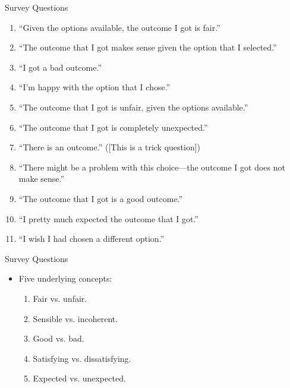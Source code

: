 \documentclass[xcolor=x11names]{beamer}
\begin{document}
\begin{frame}{Survey Questions}
  \footnotesize
  \itshape
  \begin{enumerate}\addtolength{\itemsep}{0.5\baselineskip}
    \item ``Given the options available, the outcome I got is fair.''
    \item ``The outcome that I got makes sense given the option that I selected.''
    \item ``I got a bad outcome.''
    \item ``I'm happy with the option that I chose.''
    \item ``The outcome that I got is unfair, given the options available.''
    \item ``The outcome that I got is completely unexpected.''
    \item ``There is an outcome.'' ([This is a trick question])
    \item ``There might be a problem with this choice---the outcome I got does not make sense.''
    \item ``The outcome that I got is a good outcome.''
    \item ``I pretty much expected the outcome that I got.''
    \item ``I wish I had chosen a different option.''
  \end{enumerate}
\end{frame}

\begin{frame}{Survey Questions}
  \begin{itemize}\addtolength{\itemsep}{0.5\baselineskip}
    \item Five underlying concepts:
    \begin{enumerate}\addtolength{\itemsep}{0.5\baselineskip}
      \vspace{0.5\baselineskip}
      \item Fair vs\@. unfair.
      \item Sensible vs\@. incoherent.
      \item Good vs\@. bad.
      \item Satisfying vs\@. dissatisfying.
      \item Expected vs\@. unexpected.
    \end{enumerate}
  \end{itemize}
\end{frame}
\end{document}

